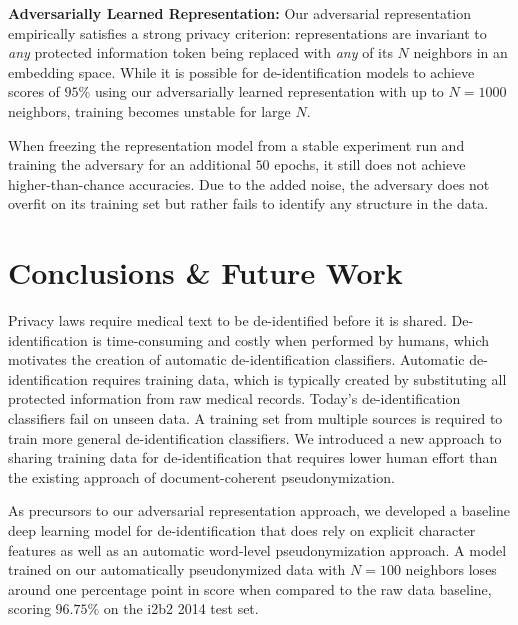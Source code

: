 \textbf{Adversarially Learned Representation:}
%
Our adversarial representation empirically satisfies a strong privacy criterion: representations are invariant to \textit{any} protected information token being replaced with \textit{any} of its $N$ neighbors in an embedding space.
%
While it is possible for de-identification models to achieve \fone scores of $95\%$ using our adversarially learned representation with up to $N=1000$ neighbors, training becomes unstable for large $N$.

%
When freezing the representation model from a stable experiment run and training the adversary for an additional $50$ epochs, it still does not achieve higher-than-chance accuracies.
%
Due to the added noise, the adversary does not overfit on its training set but rather fails to identify any structure in the data.    
%

\section{Conclusions \& Future Work}
%
Privacy laws require medical text to be de-identified before it is shared.
%
De-identifi\-ca\-tion is time-consuming and costly when performed by humans, which motivates the creation of automatic de-identification classifiers.
%
Automatic de-identification requires training data, which is typically created by substituting all protected information from raw medical records.
%
Today's de-identification classifiers fail on unseen data.
%
A training set from multiple sources is required to train more general de-identification classifiers.
%
We introduced a new approach to sharing training data for de-identification that requires lower human effort than the existing approach of document-coherent pseudonymization.

%
As precursors to our adversarial representation approach, we developed a baseline deep learning model for de-identification that does rely on explicit character features as well as an automatic word-level pseudonymization approach.
%
A model trained on our automatically pseudonymized data with $N=100$ neighbors loses around one percentage point in \fone score when compared to the raw data baseline, scoring $96.75\%$ on the i2b2 2014 test set.

